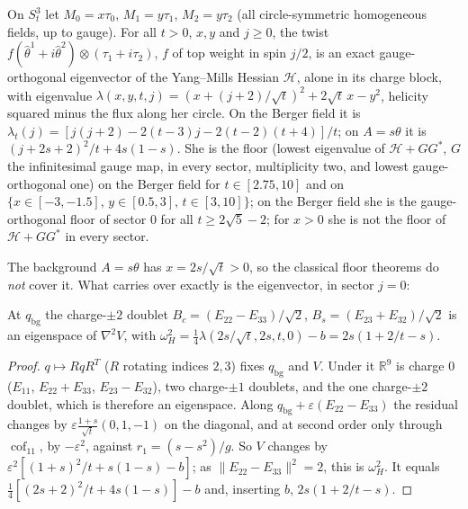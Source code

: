 \begin{theorem}\label{p3thm:helike}
On $S^3_t$ let $M_0=x\tau_0$, $M_1=y\tau_1$, $M_2=y\tau_2$ (all circle-symmetric homogeneous fields, up to gauge). For all $t>0$, $x,y$ and $j\geq0$, the twist $f(\hat\theta^1+i\hat\theta^2)\otimes(\tau_1+i\tau_2)$, $f$ of top
weight in spin $j/2$, is an exact gauge-orthogonal eigenvector of the Yang--Mills Hessian $\mathcal H$, alone in its charge block, with
eigenvalue $\lambda(x,y,t,j)=(x+(j+2)/\sqrt t)^2+2\sqrt t\,x-y^2$, helicity squared minus the flux along her circle. On
the Berger field it is $\lambda_t(j)=[j(j+2)-2(t-3)j-2(t-2)(t+4)]/t$; on $A=s\theta$ it is $(j+2s+2)^2/t+4s(1-s)$.
She is the floor (lowest eigenvalue of $\mathcal H+GG^*$, $G$ the infinitesimal gauge map, in every sector, multiplicity two, and lowest gauge-orthogonal one) on
the Berger field for $t\in[2.75,10]$ and on $\{x\in[-3,-1.5],\,y\in[0.5,3],\,t\in[3,10]\}$; on the Berger field she is
the gauge-orthogonal floor of sector $0$ for all $t\geq2\sqrt5-2$; for $x>0$ she is not the floor of $\mathcal H+GG^*$ in every sector.
\end{theorem}

The background $A=s\theta$ has $x=2s/\sqrt t>0$, so the classical floor theorems do \emph{not} cover it. What carries
over exactly is the eigenvector, in sector $j=0$:

\begin{proposition}\label{p3prop:hq}
 At $q_{\mathrm{bg}}$ the charge-$\pm2$ doublet $B_c=(E_{22}-E_{33})/\sqrt2$, $B_s=(E_{23}+E_{32})/\sqrt2$
is an eigenspace of $\nabla^2V$, with
$\omega_H^2=\tfrac14\lambda(2s/\sqrt t,2s,t,0)-b=2s(1+2/t-s)$.
\end{proposition}
\begin{proof}
$q\mapsto RqR^T$ ($R$ rotating indices $2,3$) fixes $q_{\mathrm{bg}}$ and $V$. Under it $\mathbb R^9$ is charge $0$
($E_{11}$, $E_{22}+E_{33}$, $E_{23}-E_{32}$), two charge-$\pm1$ doublets, and the one charge-$\pm2$ doublet, which is
therefore an eigenspace. Along $q_{\mathrm{bg}}+\varepsilon(E_{22}-E_{33})$ the residual changes by
$\varepsilon\tfrac{1+s}{\sqrt t}(0,1,-1)$ on the diagonal, and at second order only through $\operatorname{cof}_{11}$, by
$-\varepsilon^2$, against $r_1=(s-s^2)/g$. So $V$ changes by $\varepsilon^2[(1+s)^2/t+s(1-s)-b]$; as
$\|E_{22}-E_{33}\|^2=2$, this is $\omega_H^2$. It equals $\tfrac14[(2s+2)^2/t+4s(1-s)]-b$ and, inserting $b$, $2s(1+2/t-s)$.
\end{proof}

